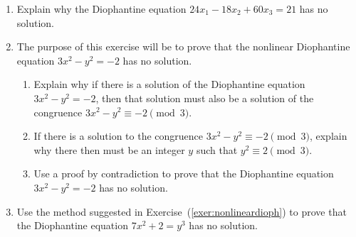 \begin{enumerate}
\item Explain why the Diophantine equation $24x_1 - 18x_2 + 60x_3 = 21$ has no solution.

\item The purpose of this exercise will be to prove that the nonlinear Diophantine equation
$3x^2 - y^2 = -2$ has no solution.
\label{exer:nonlineardioph}

\begin{enumerate}
\item Explain why if there is a solution of the Diophantine equation
$3x^2 - y^2 = -2$, then that solution must also be a solution of the congruence 
$3x^2 - y^2 \equiv -2 \pmod 3$.

\item If there is a solution to the congruence $3x^2 - y^2 \equiv -2 \pmod 3$, explain why there then must be an integer $y$ such that $y^2 \equiv 2 \pmod 3$.

\item Use a proof by contradiction to prove that the Diophantine equation $3x^2 - y^2 = -2$ has no solution.

\end{enumerate}

\item Use the method suggested in Exercise~(\ref{exer:nonlineardioph}) to prove that the Diophantine equation $7x^2 + 2 = y^3$ has no solution.

\end{enumerate}


